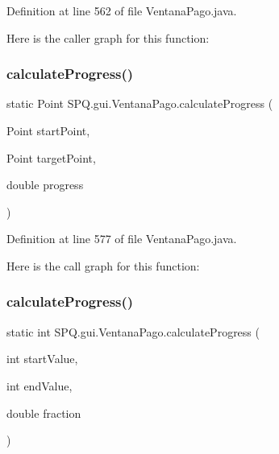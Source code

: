 Definition at line 562 of file Ventana\+Pago.\+java.

Here is the caller graph for this function\+:
\mbox{\label{class_s_p_q_1_1gui_1_1_ventana_pago_aebf84331e3789dfd9444704d43ee3104}} 
\subsubsection{\texorpdfstring{calculate\+Progress()}{calculateProgress()}\hspace{0.1cm}{\footnotesize\ttfamily [2/4]}}
{\footnotesize\ttfamily static Point S\+P\+Q.\+gui.\+Ventana\+Pago.\+calculate\+Progress (\begin{DoxyParamCaption}\item[{Point}]{start\+Point,  }\item[{Point}]{target\+Point,  }\item[{double}]{progress }\end{DoxyParamCaption})\hspace{0.3cm}{\ttfamily [static]}}



Definition at line 577 of file Ventana\+Pago.\+java.

Here is the call graph for this function\+:
\mbox{\label{class_s_p_q_1_1gui_1_1_ventana_pago_aa815284e8b31df848f8801518cf95c95}} 
\subsubsection{\texorpdfstring{calculate\+Progress()}{calculateProgress()}\hspace{0.1cm}{\footnotesize\ttfamily [3/4]}}
{\footnotesize\ttfamily static int S\+P\+Q.\+gui.\+Ventana\+Pago.\+calculate\+Progress (\begin{DoxyParamCaption}\item[{int}]{start\+Value,  }\item[{int}]{end\+Value,  }\item[{double}]{fraction }\end{DoxyParamCaption})\hspace{0.3cm}{\ttfamily [static]}}



